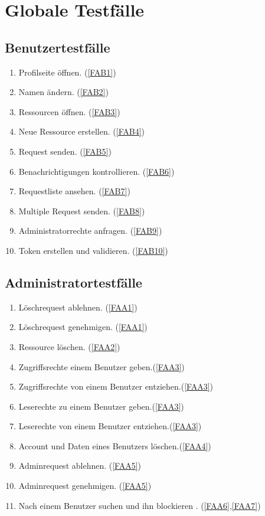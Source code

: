 \documentclass[parskip=full,11pt]{scrartcl}
\def\threedigits#1{%
  \ifnum#1<10 0\fi
  \ifnum#1<1 0\fi
  \number#1}
\begin{document}
\section{Globale Testfälle}
\subsection{Benutzertestfälle}
\begin{enumerate}[label={\textbf{/T\protect\threedigits{\theenumi}0/}}, leftmargin=*]
\item Profilseite öffnen. (\ref{FAB1})
\item Namen ändern. (\ref{FAB2})
\item Ressourcen öffnen. (\ref{FAB3})
\item Neue Ressource erstellen. (\ref{FAB4})
\item Request senden. (\ref{FAB5})
\item Benachrichtigungen kontrollieren. (\ref{FAB6})
\item Requestliste ansehen. (\ref{FAB7})
\item Multiple Request senden. (\ref{FAB8})
\item Administratorrechte anfragen. (\ref{FAB9})
\item Token erstellen und validieren. (\ref{FAB10})
\end{enumerate}

\subsection{Administratortestfälle}
\begin{enumerate}[label={\textbf{/T\protect\threedigits{\theenumi}0/}}, leftmargin=*, resume]
\item Löschrequest ablehnen. (\ref{FAA1})
\item Löschrequest genehmigen. (\ref{FAA1})
\item Ressource löschen. (\ref{FAA2})
\item Zugriffsrechte einem Benutzer geben.(\ref{FAA3})
\item Zugriffsrechte von einem Benutzer entziehen.(\ref{FAA3})
\item Leserechte zu einem Benutzer geben.(\ref{FAA3})
\item Leserechte von einem Benutzer entziehen.(\ref{FAA3})
\item Account und Daten eines Benutzers löschen.(\ref{FAA4})
\item Adminrequest ablehnen. (\ref{FAA5})
\item Adminrequest genehmigen. (\ref{FAA5})
\item Nach einem Benutzer suchen und ihn blockieren . (\ref{FAA6},\ref{FAA7})
\end{enumerate}
\end{document}
